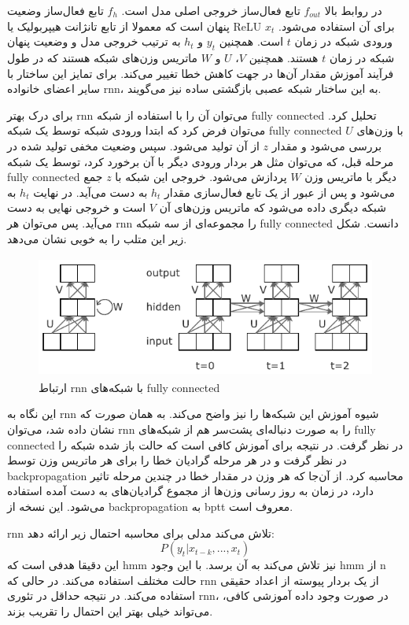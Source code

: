 در روابط بالا $f_{out}$ تابع فعال‌ساز خروجی اصلی مدل است. $f_h$ تابع فعال‌ساز
وضعیت پنهان است که معمولا از تابع تانژانت هیپربولیک یا ReLU برای آن استفاده
می‌شود. $x_t$ ورودی شبکه در زمان $t$ است. همچنین $y_t$ و $h_t$ به ترتیب خروجی
مدل و وضعیت پنهان شبکه در زمان $t$ هستند. همچنین $V$، $U$ و $W$ ماتریس وزن‌های
شبکه هستند که در طول فرآیند آموزش مقدار آن‌ها در جهت کاهش خطا تغییر می‌کند. برای
تمایز این ساختار با سایر اعضای خانواده \gls{rnn}، به این ساختار شبکه عصبی
بازگشتی ساده نیز می‌گویند.

برای درک بهتر \gls{rnn} می‌توان آن را با استفاده از شبکه \gls{fully connected}
تحلیل کرد. می‌توان فرض کرد که ابتدا ورودی شبکه توسط یک شبکه \gls{fully
connected} با وزن‌های $U$ بررسی می‌شود و مقدار $z$ از آن تولید می‌شود. سپس وضعیت
مخفی تولید شده در مرحله قبل، که می‌توان مثل هر بردار ورودی دیگر با آن برخورد
کرد، توسط یک شبکه \gls{fully connected} دیگر با ماتریس وزن $W$ پردازش می‌شود.
خروجی این شبکه با $z$ جمع می‌شود و پس از عبور از یک تابع فعال‌سازی مقدار $h_t$
به دست می‌آید. در نهایت $h_t$ به شبکه دیگری داده می‌شود که ماتریس وزن‌های آن $V$
است و خروجی نهایی به دست می‌آید. پس می‌توان هر \gls{rnn} را مجموعه‌ای از سه شبکه
\gls{fully connected} دانست. شکل زیر این متلب را به خوبی نشان می‌دهد.
\begin{figure}[ht]
    \centering
    \includegraphics[height=4cm]{./statics/rnn_unfolding.png}
    \caption{ارتباط \gls{rnn} با شبکه‌های \gls{fully connected}}
\end{figure}

این نگاه به \gls{rnn} شیوه آموزش این شبکه‌ها را نیز واضح می‌کند. به همان صورت که
نشان داده شد، می‌توان \gls{rnn} را به صورت دنباله‌ای پشت‌سر هم از شبکه‌های
\gls{fully connected} در نظر گرفت. در نتیجه برای آموزش کافی است که حالت باز شده
شبکه را در نظر گرفت و در هر مرحله گرادیان خطا را برای هر ماتریس وزن توسط
\gls{backpropagation} محاسبه کرد. از آن‌جا که هر وزن در مقدار خطا در چندین مرحله
تاثیر دارد، در زمان به روز رسانی وزن‌ها از مجموع گرادیان‌های به دست آمده استفاده
می‌شود. این نسخه از \gls{backpropagation} به \gls{bptt} معروف است.

\gls{rnn} تلاش می‌کند مدلی برای محاسبه احتمال زیر ارائه دهد:
\begin{equation}
    P(y_t | x_{t-k}, ..., x_t)
\end{equation}
این دقیقا هدفی است که \gls{hmm} نیز تلاش می‌کند به آن برسد. با این وجود
\gls{hmm} از n حالت مختلف استفاده می‌کند. در حالی که \gls{rnn} از یک بردار
پیوسته از اعداد حقیقی استفاده می‌کند. در نتیجه حداقل در تئوری \gls{rnn}، در صورت
وجود داده آموزشی کافی، می‌تواند خیلی بهتر این احتمال را تقریب بزند.

